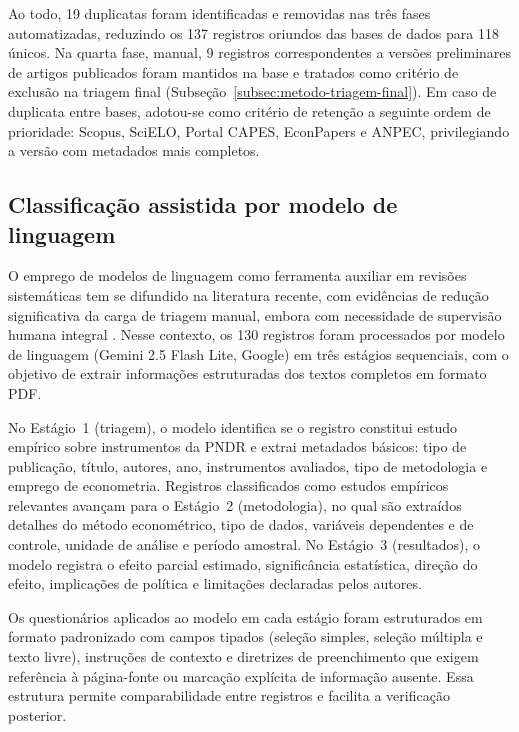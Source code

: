 Ao todo, 19 duplicatas foram identificadas e removidas nas três fases automatizadas, reduzindo os 137 registros oriundos das bases de dados para 118 únicos. Na quarta fase, manual, 9 registros correspondentes a versões preliminares de artigos publicados foram mantidos na base e tratados como critério de exclusão na triagem final (Subseção~\ref{subsec:metodo-triagem-final}). Em caso de duplicata entre bases, adotou-se como critério de retenção a seguinte ordem de prioridade: Scopus, SciELO, Portal CAPES, EconPapers e ANPEC, privilegiando a versão com metadados mais completos.

\subsection{Classificação assistida por modelo de linguagem}
\label{subsec:metodo-classificacao-llm}

O emprego de modelos de linguagem como ferramenta auxiliar em revisões sistemáticas tem se difundido na literatura recente, com evidências de redução significativa da carga de triagem manual, embora com necessidade de supervisão humana integral \cite{Wagner2026,DelgadoChaves2025,Scherbakov2025}. Nesse contexto, os 130 registros foram processados por modelo de linguagem (Gemini 2.5 Flash Lite, Google) em três estágios sequenciais, com o objetivo de extrair informações estruturadas dos textos completos em formato PDF.

No Estágio~1 (triagem), o modelo identifica se o registro constitui estudo empírico sobre instrumentos da PNDR e extrai metadados básicos: tipo de publicação, título, autores, ano, instrumentos avaliados, tipo de metodologia e emprego de econometria. Registros classificados como estudos empíricos relevantes avançam para o Estágio~2 (metodologia), no qual são extraídos detalhes do método econométrico, tipo de dados, variáveis dependentes e de controle, unidade de análise e período amostral. No Estágio~3 (resultados), o modelo registra o efeito parcial estimado, significância estatística, direção do efeito, implicações de política e limitações declaradas pelos autores.

Os questionários aplicados ao modelo em cada estágio foram estruturados em formato padronizado com campos tipados (seleção simples, seleção múltipla e texto livre), instruções de contexto e diretrizes de preenchimento que exigem referência à página-fonte ou marcação explícita de informação ausente. Essa estrutura permite comparabilidade entre registros e facilita a verificação posterior.

